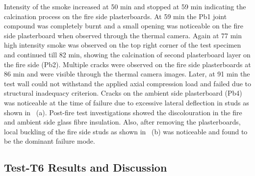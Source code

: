 Intensity of the smoke increased at 50 min and stopped at 59 min indicating the calcination process on the fire side plasterboards. At 59 min the Pb1 joint compound was completely burnt and a small opening was noticeable on the fire side plasterboard when observed through the thermal camera. Again at 77 min high intensity smoke was observed on the top right corner of the test specimen and continued till 82 min, showing the calcination of second plasterboard layer on the fire side (Pb2). Multiple cracks were observed on the fire side plasterboards at 86 min and were visible through the thermal camera images. Later, at 91 min the test wall could not withstand the applied axial compression load and failed due to structural inadequacy criterion. Cracks on the ambient side plasterboard (Pb4) was noticeable at the time of failure due to excessive lateral deflection in studs as shown in ~(a). Post-fire test investigations showed the discolouration in the fire and ambient side glass fibre insulation. Also, after removing the plasterboards, local buckling of the fire side studs as shown in ~(b) was noticeable and found to be the dominant failure mode.

\subsection{Test-T6 Results and Discussion}

